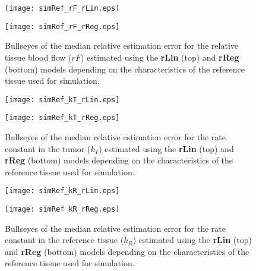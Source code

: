 \begin{figure}
\texttt{[image: simRef\_rF\_rLin.eps]}
\par\vspace{1cm}
\texttt{[image: simRef\_rF\_rReg.eps]}
\caption{Bullseyes of the median relative estimation error for the relative tissue blood flow ($rF$) estimated using the \textbf{rLin} (top) and \textbf{rReg} (bottom) models depending on the characteristics of the reference tissue used for simulation.}
\label{fig:referenceTissue_rF}
\end{figure}

\begin{figure}
\texttt{[image: simRef\_kT\_rLin.eps]}
\par\vspace{1cm}
\texttt{[image: simRef\_kT\_rReg.eps]}
\caption{Bullseyes of the median relative estimation error for the rate constant in the tumor ($k_T$) estimated using the \textbf{rLin} (top) and \textbf{rReg} (bottom) models depending on the characteristics of the reference tissue used for simulation.}
\label{fig:referenceTissue_kT}
\end{figure}

\begin{figure}
\texttt{[image: simRef\_kR\_rLin.eps]}
\par\vspace{1cm}
\texttt{[image: simRef\_kR\_rReg.eps]}
\caption{Bullseyes of the median relative estimation error for the rate constant in the reference tissue ($k_R$) estimated using the \textbf{rLin} (top) and \textbf{rReg} (bottom) models depending on the characteristics of the reference tissue used for simulation.}
\label{fig:referenceTissue_kR}
\end{figure}


